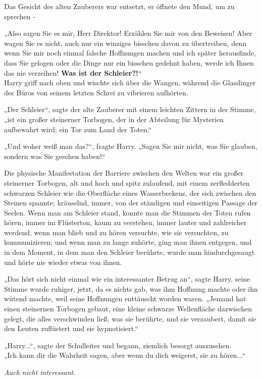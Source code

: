 {Das Gesicht des alten Zauberers war entsetzt, er öffnete den Mund, um zu sprechen -

„Also sagen Sie es mir, Herr Direktor! Erzählen Sie mir von den Beweisen! Aber wagen Sie es nicht, auch nur ein winziges bisschen davon zu übertreiben, denn wenn Sie mir noch einmal falsche Hoffnungen machen und ich später herausfinde, dass Sie gelogen oder die Dinge nur ein bisschen gedehnt haben, werde ich Ihnen das nie verzeihen! \textbf{Was ist der Schleier?!}“\\ Harry griff nach oben und wischte sich über die Wangen, während die Glasdinger des Büros von seinem letzten Schrei zu vibrieren aufhörten.

„Der Schleier“, sagte der alte Zauberer mit einem leichten Zittern in der Stimme, „ist ein großer steinerner Torbogen, der in der Abteilung für Mysterien aufbewahrt wird; ein Tor zum Land der Toten.“

„Und woher weiß man das?“, fragte Harry. „Sagen Sie mir nicht, was Sie glauben, sondern was Sie gesehen haben!“

Die physische Manifestation der Barriere zwischen den Welten war ein großer steinerner Torbogen, alt und hoch und spitz zulaufend, mit einem zerfledderten schwarzen Schleier wie die Oberfläche eines Wasserbeckens, der sich zwischen den Steinen spannte; kräuselnd, immer, von der ständigen und einseitigen Passage der Seelen. Wenn man am Schleier stand, konnte man die Stimmen der Toten rufen hören, immer im Flüsterton, kaum zu verstehen, immer lauter und zahlreicher werdend, wenn man blieb und zu hören versuchte, wie sie versuchten, zu kommunizieren; und wenn man zu lange zuhörte, ging man ihnen entgegen, und in dem Moment, in dem man den Schleier berührte, wurde man hindurchgesaugt und hörte nie wieder etwas von ihnen.

„Das hört sich nicht einmal wie ein interessanter Betrug an“, sagte Harry, seine Stimme wurde ruhiger, jetzt, da es nichts gab, was ihm Hoffnung machte oder ihn wütend machte, weil seine Hoffnungen enttäuscht worden waren. „Jemand hat einen steinernen Torbogen gebaut, eine kleine schwarze Wellenfläche dazwischen gelegt, die alles verschwinden ließ, was sie berührte, und sie verzaubert, damit sie den Leuten zuflüstert und sie hypnotisiert.“

„Harry...“, sagte der Schulleiter und begann, ziemlich besorgt auszusehen.\\ „Ich kann dir die Wahrheit sagen, aber wenn du dich weigerst, sie zu hören...“

\emph{Auch nicht interessant}.

}
